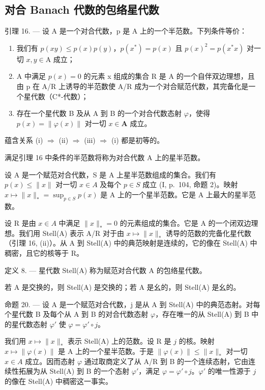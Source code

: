 \subsection{对合 Banach 代数的包络星代数}

引理 16. --- 设 A 是一个对合代数，p 是 A 上的一个半范数。下列条件等价：

\begin{enumerate}
\def\labelenumi{(\roman{enumi})}
\item
  我们有 \(p(xy) \leqslant p(x)p(y)\)，\(p(x^{*}) = p(x)\) 且 \(p(x)^{2} = p(x^{*}x)\) 对一切 \(x, y \in \mathrm{A}\) 成立；
\item
  A 中满足 \(p(x) = 0\) 的元素 x 组成的集合 R 是 A 的一个自伴双边理想，且由 p 在 A/R 上诱导的半范数使 A/R 成为一个对合赋范代数，其完备化是一个星代数（C*-代数）；
\item
  存在一个星代数 B 及从 A 到 B 的一个对合代数态射 \(\varphi\)，使得 \(p(x) = \|\varphi(x)\|\) 对一切 \(x\in\mathbf{A}\) 成立。
\end{enumerate}

蕴含关系 (i) \(\Longrightarrow\) (ii) \(\Longrightarrow\) (iii) \(\Longrightarrow\) (i) 都是初等的。

满足引理 16 中条件的半范数将称为对合代数 A 上的星半范数。

设 A 是一个赋范对合代数，S 是 A 上星半范数组成的集合。我们有 \(p(x) \leqslant \|x\|\) 对一切 \(x \in A\) 及每个 \(p \in S\) 成立 (I, p.~104, 命题 2)。映射 \(x \mapsto \|x\|_* = \sup_{p \in S} p(x)\) 是 A 上的一个星半范数。它是 A 上最大的星半范数。

设 R 是由 \(x \in A\) 中满足 \(\|x\|_{*} = 0\) 的元素组成的集合。它是 A 的一个闭双边理想。我们用 Stell(A) 表示 A/R 对于由 \(x \mapsto \|x\|_{*}\) 诱导的范数的完备化星代数（引理 16, (ii)）。从 A 到 Stell(A) 中的典范映射是连续的，它的像在 Stell(A) 中稠密，且它的核等于 R。

定义 8. --- 星代数 Stell(A) 称为赋范对合代数 A 的包络星代数。

若 A 是交换的，则 Stell(A) 是交换的；若 A 是幺的，则 Stell(A) 是幺的。

命题 20. --- 设 A 是一个赋范对合代数，j 是从 A 到 Stell(A) 中的典范态射。对每个星代数 B 及每个从 A 到 B 的对合代数态射 \(\varphi\)，存在唯一的从 Stell(A) 到 B 中的星代数态射 \(\varphi'\) 使 \(\varphi = \varphi' \circ j\)。

我们用 \(x \mapsto \|x\|_*\) 表示 Stell(A) 上的范数。设 R 是 \(j\) 的核。映射 \(x \mapsto \| \varphi(x) \|\) 是 A 上的一个星半范数。于是 \(\| \varphi(x) \| \leqslant \| x \|_*\) 对一切 \(x \in A\) 成立。因而态射 \(\varphi\) 通过取商定义了从 A/R 到 B 的一个连续态射，它由连续性拓展为从 Stell(A) 到 B 的一个态射 \(\varphi'\)，满足 \(\varphi = \varphi' \circ j\)。\(\varphi'\) 的唯一性源于 \(j\) 的像在 Stell(A) 中稠密这一事实。

